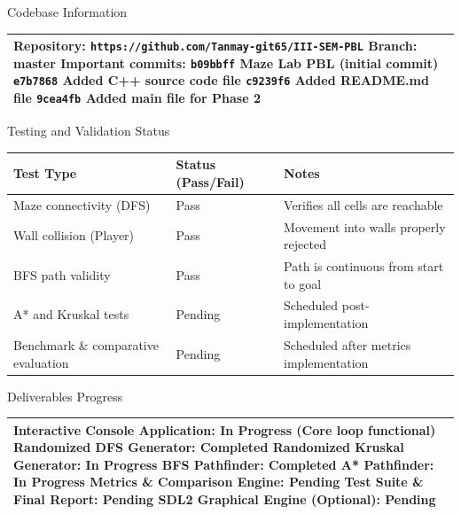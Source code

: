 \documentclass[12pt,a4paper]{article}
\newcommand{\secthead}[2]{%
  {\fontsize{18}{21.9}\selectfont\color{geheading}#1\par}\vspace{1.6pt}%
  {\fontsize{10.5}{14.5}\selectfont\color{gehint}#2\par}%
  \vspace{\secgap}}
\newlength{\secgap}\setlength{\secgap}{5.7pt}
\newcommand{\afterbox}{\vspace{\aftergap}}
\newlength{\aftergap}\setlength{\aftergap}{16pt}
\newenvironment{answerbox}{%
  \noindent\begin{tabular}{|p{485.1pt}|}\hline
  \fontsize{11}{13.6}\selectfont\setlength{\parskip}{4pt}\rule{0pt}{22.5pt}\ignorespaces}{%
  \rule[-16pt]{0pt}{0pt}\\\hline\end{tabular}\par}
\newcommand{\tablehead}[1]{\fontsize{12}{14.5}\selectfont\bfseries #1}
\newcommand{\tablebody}{\fontsize{11}{13.6}\selectfont\rule[-5.5pt]{0pt}{19pt}}
\begin{document}
\newpage
\secthead{Codebase Information }{}
\begin{answerbox}
Repository: \texttt{https://github.com/Tanmay-git65/III-SEM-PBL} \newline
Branch: master\newline
Important commits:\newline
\hspace*{12pt}\texttt{b09bbff} Maze Lab PBL (initial commit)\newline
\hspace*{12pt}\texttt{e7b7868} Added C++ source code file\newline
\hspace*{12pt}\texttt{c9239f6} Added README.md file\newline
\hspace*{12pt}\texttt{9cea4fb} Added main file for Phase 2
\end{answerbox}
\afterbox

\secthead{Testing and Validation Status }{}
\noindent\begin{tabular}{|R{169.2pt}|R{154.4pt}|R{136.7pt}|}
\hline
\tablehead{Test Type} & \tablehead{Status (Pass/Fail)} & \tablehead{Notes} \\
\hline
\tablebody Maze connectivity (DFS) & \tablebody Pass & \tablebody Verifies all cells are reachable \\
\hline
\tablebody Wall collision (Player) & \tablebody Pass & \tablebody Movement into walls properly rejected \\
\hline
\tablebody BFS path validity & \tablebody Pass & \tablebody Path is continuous from start to goal \\
\hline
\tablebody A* and Kruskal tests & \tablebody Pending & \tablebody Scheduled post-implementation \\
\hline
\tablebody Benchmark \& comparative evaluation & \tablebody Pending & \tablebody Scheduled after metrics implementation \\
\hline
\end{tabular}
\afterbox

\secthead{Deliverables Progress }{}
\begin{answerbox}
Interactive Console Application: In Progress (Core loop functional)\newline
Randomized DFS Generator: Completed\newline
Randomized Kruskal Generator: In Progress\newline
BFS Pathfinder: Completed\newline
A* Pathfinder: In Progress\newline
Metrics \& Comparison Engine: Pending\newline
Test Suite \& Final Report: Pending\newline
SDL2 Graphical Engine (Optional): Pending
\end{answerbox}
\end{document}
